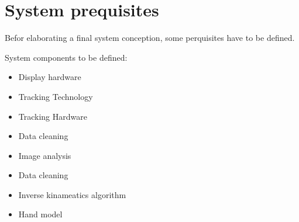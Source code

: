 \chapter{System prequisites}

Befor elaborating a final system conception, some perquisites have to be defined.

System components to be defined:
\begin{itemize}
 \item Display hardware
 \item Tracking Technology
 \item Tracking Hardware
 \item Data cleaning
 \item Image analysis
 \item Data cleaning
 \item Inverse kinameatics algorithm
 \item Hand model
 \end{itemize} 

